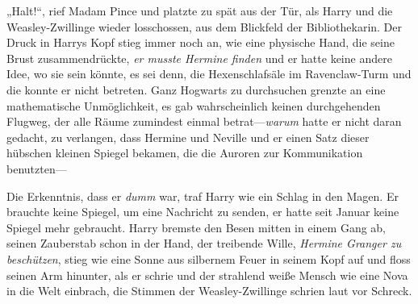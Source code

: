 „Halt!“, rief Madam Pince und platzte zu spät aus der Tür, als Harry und die Weasley-Zwillinge wieder losschossen, aus dem Blickfeld der Bibliothekarin.
Der Druck in Harrys Kopf stieg immer noch an, wie eine physische Hand, die seine Brust zusammendrückte, \emph{er musste Hermine finden} und er hatte keine andere Idee, wo sie sein könnte, es sei denn, die Hexenschlafsäle im Ravenclaw-Turm und die konnte er nicht betreten. Ganz Hogwarts zu durchsuchen grenzte an eine mathematische Unmöglichkeit, es gab wahrscheinlich keinen durchgehenden Flugweg, der alle Räume zumindest einmal betrat—\emph{warum} hatte er nicht daran gedacht, zu verlangen, dass Hermine und Neville und er einen Satz dieser hübschen kleinen Spiegel bekamen, die die Auroren zur Kommunikation benutzten—

Die Erkenntnis, dass er \emph{dumm} war, traf Harry wie ein Schlag in den Magen. Er brauchte keine Spiegel, um eine Nachricht zu senden, er hatte seit Januar keine Spiegel mehr gebraucht. Harry bremste den Besen mitten in einem Gang ab, seinen Zauberstab schon in der Hand, der treibende Wille, \emph{Hermine Granger zu beschützen}, stieg wie eine Sonne aus silbernem Feuer in seinem Kopf auf und floss seinen Arm hinunter, als er  schrie und der strahlend weiße Mensch wie eine Nova in die Welt einbrach, die Stimmen der Weasley-Zwillinge schrien laut vor Schreck.

